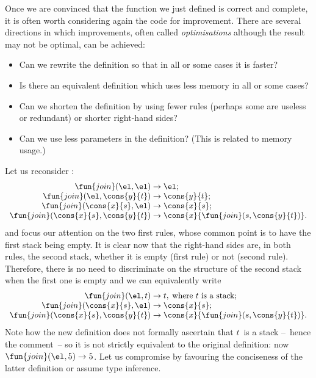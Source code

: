 Once we are convinced that the function we just defined is correct and
complete, 
 it is often worth considering again the code for
improvement. There are several directions in which improvements, often
called \emph{optimisations} although the result may not be optimal,
can be achieved:
\begin{itemize}

  \item Can we rewrite the definition so that in all or some cases it
    is faster?

  \item Is there an equivalent definition which uses less memory in
    all or some cases?

  \item Can we shorten the definition by using fewer rules (perhaps
    some are useless or redundant) or shorter right\hyp{}hand sides?

  \item Can we use less parameters in the definition? (This is related
    to memory usage.)

\end{itemize}
Let us reconsider :
\begin{equation*}
\begin{array}{r@{\;}l@{\;}l}
\fun{join}(\el,\el) & \rightarrow & \el;\\
\fun{join}(\el,\cons{y}{t}) & \rightarrow & \cons{y}{t};\\
\fun{join}(\cons{x}{s},\el) & \rightarrow & \cons{x}{s};\\
\fun{join}(\cons{x}{s},\cons{y}{t}) & \rightarrow & \cons{x}{\fun{join}(s,\cons{y}{t})}.
\end{array}
\end{equation*}
and focus our attention on the two first rules, whose common point is
to have the first stack being empty. It is clear now that the
right\hyp{}hand sides are, in both rules, the second stack, whether it
is empty (first rule) or not (second rule). Therefore, there is no
need to discriminate on the structure of the second stack when the
first one is empty and we can equivalently write
\begin{equation*}
\begin{array}{r@{\;}l@{\;}l}
\fun{join}(\el,t) & \rightarrow & t,\;\text{where \(t\) is a stack};\\
\fun{join}(\cons{x}{s},\el) & \rightarrow & \cons{x}{s};\\
\fun{join}(\cons{x}{s},\cons{y}{t}) & \rightarrow &
  \cons{x}{\fun{join}(s,\cons{y}{t})}.
\end{array}
\end{equation*}
Note how the new definition does not formally ascertain that \(t\)~is
a stack --~hence the comment~-- so it is not strictly equivalent to
the original definition: now \(\fun{join}(\el,5) \rightarrow 5\). Let
us compromise by favouring the conciseness of the latter definition or
assume type inference.

